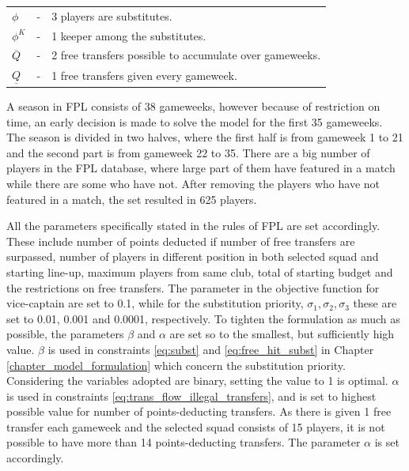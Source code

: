 \begin{table}[H]
\begin{tabular}{@{}lll@{}}
$\phi$                         & - & 3 players are substitutes.                                                         \\
$\phi^{K}$                   & - & 1 keeper among the substitutes.                                                          \\
$\overline{Q}$                   & - & 2 free transfers possible to accumulate over gameweeks.                                              \\
$\underline{Q}$                  & - & 1 free transfers given every gameweek.                                      \\ \bottomrule
\end{tabular}
\label{tab:initialization_of_parameters}
\end{table}

 
A season in FPL consists of 38 gameweeks, however because of restriction on time, an early decision is made to solve the model for the first 35 gameweeks. The season is divided in two halves, where the first half is from gameweek 1 to 21 and the second part is from gameweek 22 to 35. There are a big number of players in the FPL database, where large part of them have featured in a match while there are some who have not. After removing the players who have not featured in a match, the set resulted in 625 players. 

\newpar

All the parameters specifically stated in the rules of FPL are set accordingly. These include number of points deducted if number of free transfers are surpassed, number of players in different position in both selected squad and starting line-up, maximum players from same club, total of starting budget and the restrictions on free transfers. The parameter in the objective function for vice-captain are set to 0.1, while for the substitution priority, $\sigma_{1}, \sigma_{2}, \sigma_{3}$ these are set to 0.01, 0.001 and 0.0001, respectively. To tighten the formulation as much as possible, the parameters $\beta$ and $\alpha$ are set so to the smallest, but sufficiently high value. $\beta$ is used in constraints \eqref{eq:subst} and \eqref{eq:free_hit_subst} in Chapter \ref{chapter_model_formulation} which concern the substitution priority. Considering the variables adopted are binary, setting the value to 1 is optimal. $\alpha$ is used in constraints \eqref{eq:trans_flow_illegal_transfers}, and is set to highest possible value for number of points-deducting transfers. As there is given 1 free transfer each gameweek and the selected squad consists of 15 players, it is not possible to have more than 14 points-deducting transfers. The parameter $\alpha$ is set accordingly. 

